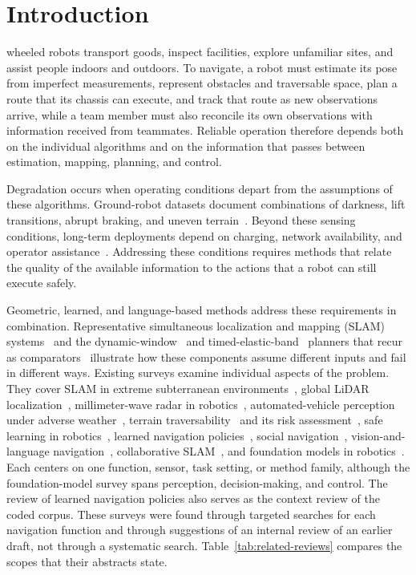 \section{Introduction}
\label{sec:intro}
 wheeled robots transport goods, inspect facilities, explore unfamiliar sites, and assist people indoors and outdoors. To navigate, a robot must estimate its pose from imperfect measurements, represent obstacles and traversable space, plan a route that its chassis can execute, and track that route as new observations arrive, while a team member must also reconcile its own observations with information received from teammates. Reliable operation therefore depends both on the individual algorithms and on the information that passes between estimation, mapping, planning, and control.

Degradation occurs when operating conditions depart from the assumptions of these algorithms. Ground-robot datasets document combinations of darkness, lift transitions, abrupt braking, and uneven terrain~\cite{P_M41,P_F11}. Beyond these sensing conditions, long-term deployments depend on charging, network availability, and operator assistance~\cite{P_M37}. Addressing these conditions requires methods that relate the quality of the available information to the actions that a robot can still execute safely.

Geometric, learned, and language-based methods address these requirements in combination. Representative simultaneous localization and mapping (SLAM) systems~\cite{B_ORBSLAM32021,B_FASTLIO22022} and the dynamic-window~\cite{B_DWA1997} and timed-elastic-band~\cite{B_TEB2013} planners that recur as comparators~\cite{P_M06,P_M30} illustrate how these components assume different inputs and fail in different ways. Existing surveys examine individual aspects of the problem. They cover SLAM in extreme subterranean environments~\cite{B_SubTSLAM2024}, global LiDAR localization~\cite{B_GlobalLiDARLoc2024}, millimeter-wave radar in robotics~\cite{B_RadarSurvey2024}, automated-vehicle perception under adverse weather~\cite{B_AdverseWeather2023}, terrain traversability~\cite{B_Traversability2022} and its risk assessment~\cite{B_TraversabilityRisk2024}, safe learning in robotics~\cite{B_SafeLearning2022}, learned navigation policies~\cite{P_X04}, social navigation~\cite{B_SocialNav2023}, vision-and-language navigation~\cite{B_VLNSurvey2022}, collaborative SLAM~\cite{B_CSLAM2022}, and foundation models in robotics~\cite{B_Foundation2024}. Each centers on one function, sensor, task setting, or method family, although the foundation-model survey spans perception, decision-making, and control. The review of learned navigation policies also serves as the context review of the coded corpus. These surveys were found through targeted searches for each navigation function and through suggestions of an internal review of an earlier draft, not through a systematic search. Table~\ref{tab:related-reviews} compares the scopes that their abstracts state.

